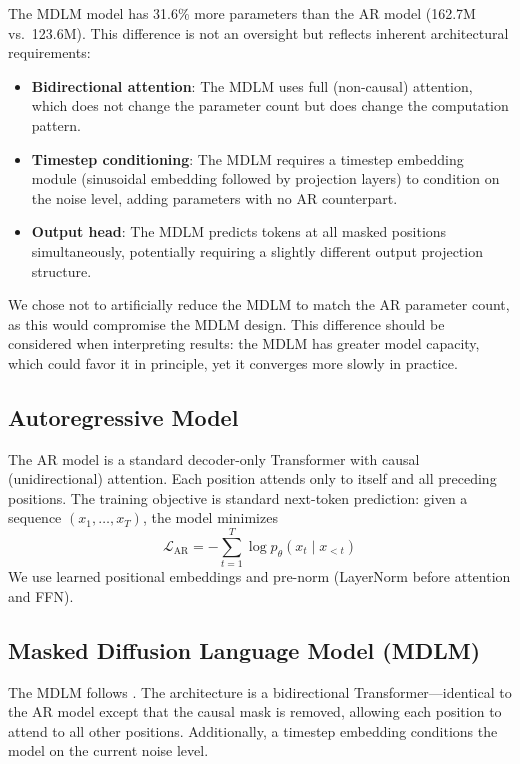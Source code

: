 \documentclass[11pt,a4paper]{article}
\begin{document}
The MDLM model has 31.6\% more parameters than the AR model (162.7M vs.\ 123.6M).
This difference is not an oversight but reflects inherent architectural requirements:
\begin{itemize}[leftmargin=*,itemsep=2pt]
  \item \textbf{Bidirectional attention}: The MDLM uses full (non-causal) attention, which does not change the parameter count but does change the computation pattern.
  \item \textbf{Timestep conditioning}: The MDLM requires a timestep embedding module (sinusoidal embedding followed by projection layers) to condition on the noise level, adding parameters with no AR counterpart.
  \item \textbf{Output head}: The MDLM predicts tokens at all masked positions simultaneously, potentially requiring a slightly different output projection structure.
\end{itemize}
We chose not to artificially reduce the MDLM to match the AR parameter count, as this would compromise the MDLM design.
This difference should be considered when interpreting results: the MDLM has greater model capacity, which could favor it in principle, yet it converges more slowly in practice.

\subsection{Autoregressive Model}

The AR model is a standard decoder-only Transformer with causal (unidirectional) attention.
Each position attends only to itself and all preceding positions.
The training objective is standard next-token prediction: given a sequence $(x_1, \ldots, x_T)$, the model minimizes
\begin{equation}
  \mathcal{L}_{\text{AR}} = -\sum_{t=1}^{T} \log p_\theta(x_t \mid x_{<t})
\end{equation}
We use learned positional embeddings and pre-norm (LayerNorm before attention and FFN).

\subsection{Masked Diffusion Language Model (MDLM)}

The MDLM follows \citet{mdlm}.
The architecture is a bidirectional Transformer---identical to the AR model except that the causal mask is removed, allowing each position to attend to all other positions.
Additionally, a timestep embedding conditions the model on the current noise level.
\end{document}
